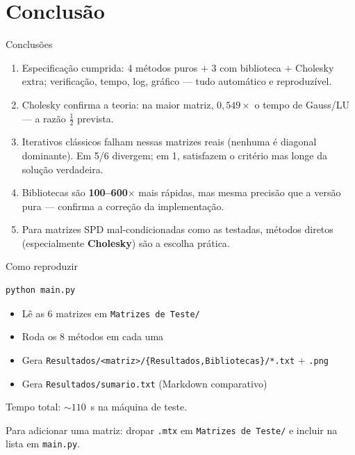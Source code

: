 \documentclass[10pt,aspectratio=169]{beamer}
\begin{document}
\section{Conclusão}

\begin{frame}{Conclusões}
  \begin{enumerate}
    \item \alert{Especificação cumprida:} 4 métodos puros + 3 com biblioteca + Cholesky extra; verificação, tempo, log, gráfico --- tudo automático e reproduzível.
    \item \alert{Cholesky confirma a teoria:} na maior matriz, $0{,}549\times$ o tempo de Gauss/LU --- a razão $\tfrac{1}{2}$ prevista.
    \item \alert{Iterativos clássicos falham} nessas matrizes reais (nenhuma é diagonal dominante).
      Em 5/6 divergem; em 1, satisfazem o critério mas longe da solução verdadeira.
    \item \alert{Bibliotecas} são \textbf{100--600$\times$} mais rápidas, mas \alert{mesma precisão} que a versão pura --- confirma a correção da implementação.
    \item Para matrizes SPD mal-condicionadas como as testadas, métodos diretos (especialmente \textbf{Cholesky}) são a \alert{escolha prática}.
  \end{enumerate}
\end{frame}

\begin{frame}[fragile]{Como reproduzir}
  \begin{lstlisting}[language=bash,basicstyle=\ttfamily\small]
python main.py
  \end{lstlisting}

  \vspace{0.5em}
  \begin{itemize}
    \item Lê as 6 matrizes em \texttt{Matrizes de Teste/}
    \item Roda os 8 métodos em cada uma
    \item Gera \texttt{Resultados/<matriz>/\{Resultados,Bibliotecas\}/*.txt} $+$ \texttt{.png}
    \item Gera \texttt{Resultados/sumario.txt} (Markdown comparativo)
  \end{itemize}

  \vspace{0.8em}
  \alert{Tempo total:} $\sim 110$~s na máquina de teste.

  \vspace{0.6em}
  \small Para adicionar uma matriz: dropar \texttt{.mtx} em \texttt{Matrizes de Teste/} e incluir na lista em \texttt{main.py}.
\end{frame}
\end{document}
